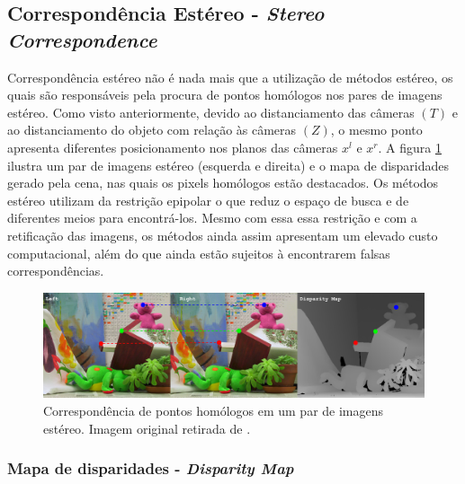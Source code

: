 \subsection{Correspondência Estéreo - \textit{Stereo Correspondence}}

Correspondência estéreo não é nada mais que a utilização de métodos estéreo, os quais são responsáveis pela procura de pontos homólogos nos pares de imagens estéreo. Como visto anteriormente, devido ao distanciamento das câmeras $(T)$ e ao distanciamento do objeto com relação às câmeras $(Z)$, o mesmo ponto apresenta diferentes posicionamento nos planos das câmeras $x^l$ e $x^r$. A figura \ref{homologous_points _stereo} ilustra um par de imagens estéreo (esquerda e direita) e o mapa de disparidades gerado pela cena, nas quais os pixels homólogos estão destacados. Os métodos estéreo utilizam da restrição epipolar o que reduz o espaço de busca e de diferentes meios para encontrá-los. Mesmo com essa essa restrição e com a retificação das imagens, os métodos ainda assim apresentam um elevado custo computacional, além do que ainda estão sujeitos à encontrarem falsas correspondências. 

\begin{figure}[H]
 	\centering
 	\includegraphics[scale=0.33]{./Resources/homologous_points_stereo.png}
 	\caption{Correspondência de pontos homólogos em um par de imagens estéreo. Imagem original retirada de \cite{Scharstein2003}.}
 	\label{homologous_points _stereo}
\end{figure}


\subsubsection{Mapa de disparidades - \textit{Disparity Map}}

